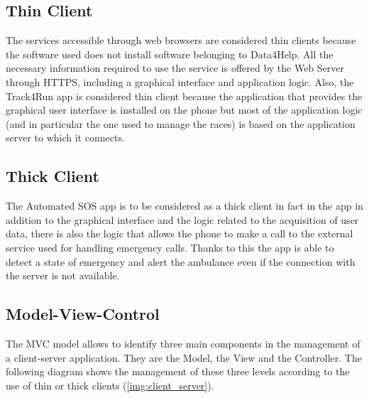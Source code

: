 \subsection{Thin Client}
The services accessible through web browsers are considered thin clients because the software used does not install software belonging to Data4Help.
All the necessary information required to use the service is offered by the Web Server through HTTPS, including a graphical interface and application logic.
Also, the Track4Run app is considered thin client because the application that provides the graphical user interface is installed on the phone but most of the application logic (and in particular the one used to manage the races) is based on the application server to which it connects.

\subsection{Thick Client}
The Automated SOS app is to be considered as a thick client in fact in the app in addition to the graphical interface and the logic related to the acquisition of user data, there is also the logic that allows the phone to make a call to the external service used for handling emergency calls.
Thanks to this the app is able to detect a state of emergency and alert the ambulance even if the connection with the server is not available.

\subsection{Model-View-Control}
The MVC model allows to identify three main components in the management of a client-server application. They are the Model, the View and the Controller.
The following diagram shows the management of these three levels according to the use of thin or thick clients (\ref{img:client_server}).

